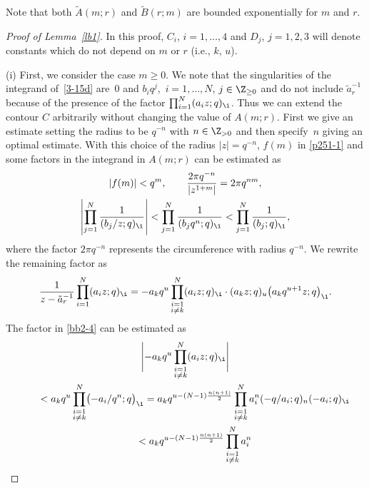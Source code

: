  Note that
 both $\tilde{A}(m;r)$ and $\tilde{B}(r;m)$ are bounded exponentially for $m$ and $r$.

\begin{proof}[Proof of Lemma~\ref{lb1}]
In this proof, $C_i$, $i=1,\dots,4$ and $D_j$, $j=1,2,3$ will denote constants which do not depend on $m$ or $r$ (i.e., $k$, $u$).

(i) First, we consider the case $m\ge 0$.
We note that the singularities of the integrand of~\eqref{3-15d} are~$0$ and $b_iq^j,$ $i=1,\dots,N$, $j\in\Z_{\ge0}$ and do not include $\tilde{a}_r^{-1}$
because of the presence of the factor $\prod_{i=1}^N(a_iz;q)_{\i}$. Thus we can extend the contour $C$ arbitrarily without changing
the value of $A(m;r)$. First we give an estimate setting the radius to be $q^{-n}$ with $n\in\Z_{>0}$ and then specify~$n$ giving an optimal estimate. With this choice of the radius $|z|=q^{-n}$, $f(m)$ in \eqref{p251-1} and some factors in the integrand in $A(m;r)$
can be estimated as
\begin{gather}
 |f(m)|<q^m,
\qquad
 \frac{2\pi q^{-n}}{|z^{1+m}|}=2\pi q^{n m},\nonumber
\\
 \left|\prod_{j=1}^N\frac{1}{(b_j/z;q)_{\i}}\right|
 <\prod_{j=1}^N\frac{1}{(b_j q^n;q)_{\i}}
 <\prod_{j=1}^N\frac{1}{(b_j;q)_{\i}},\label{bb2-3}
\end{gather}
where the factor $2\pi q^{-n}$ represents
the circumference with radius $q^{-n}$.
We rewrite the remaining factor as
\begin{align}
\label{bb2-4}
 \frac{1}{z-\tilde{a}_{r}^{-1}}
 \prod_{i=1}^N(a_i z;q)_{\i}
 =
 -a_k q^{u}
 \prod_{\substack{i=1\\i\neq k}}^N(a_i z;q)_{\i}
 \cdot (a_k z;q)_{u} \big(a_k q^{u+1}z;q\big)_{\i}.
\end{align}
The factor  in \eqref{bb2-4} can be estimated as
\begin{gather}
 \Biggl|-a_kq^u\prod_{\substack{i=1\\i\neq k}}^N(a_i z;q)_{\i}\Biggr|\nonumber\\
\qquad < a_kq^u\prod_{\substack{i=1\\i\neq k}}^N\bigl(-a_i/q^n ;q\bigr)_{\i}
 =a_k
 q^{u-(N-1)\frac{n(n+1)}{2}}
 \prod_{\substack{i=1\\i\neq k}}^N a_i^n
 (-q/a_i;q)_n(-a_i;q)_\i
 \nonumber\\
\qquad <a_k
 q^{u-(N-1)\frac{n(n+1)}{2}}
 \prod_{\substack{i=1\\i\neq k}}^N a_i^n

\end{gather}
\end{proof}
